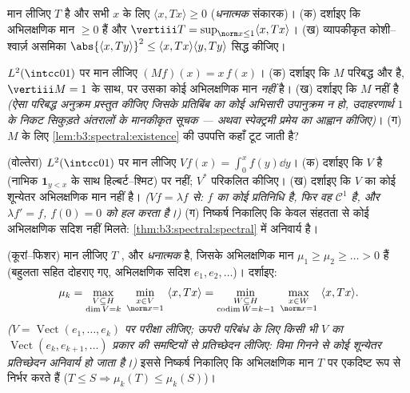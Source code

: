 \begin{exercise}[$\star\star$]\label{exo:b3:spectral:5}
मान लीजिए $T$  है और सभी $x$ के लिए $\langle x, Tx\rangle \geq 0$
(\emph{धनात्मक} संकारक)।
(क) दर्शाइए कि अभिलक्षणिक मान $\geq 0$ हैं और $\vertiii T =
\sup_{\norm x\leq1}\langle x, Tx\rangle$।
(ख) व्यापकीकृत कोशी--श्वार्ज़ असमिका $\abs{\langle x, Ty\rangle}^2 \leq \langle x, Tx\rangle\langle
y, Ty\rangle$ सिद्ध कीजिए।
\end{exercise}

\begin{exercise}[$\star\star$]\label{exo:b3:spectral:6}
$L^2(\intcc01)$ पर मान लीजिए $(Mf)(x) = x\,f(x)$।
(क) दर्शाइए कि $M$ परिबद्ध और  है, $\vertiii M =
1$ के साथ, पर
उसका कोई अभिलक्षणिक मान \emph{नहीं} है।
(ख) दर्शाइए कि $M$  नहीं है \emph{(ऐसा परिबद्ध अनुक्रम
प्रस्तुत कीजिए जिसके प्रतिबिंब का कोई अभिसारी उपानुक्रम न हो,
उदाहरणार्थ $1$ के निकट सिकुड़ते अंतरालों के मानकीकृत सूचक ---
अथवा स्पेक्ट्रमी प्रमेय का आह्वान कीजिए)}।
(ग) $M$ के लिए \cref{lem:b3:spectral:existence} की उपपत्ति कहाँ टूट जाती है?
\end{exercise}

\begin{exercise}[$\star\star$]\label{exo:b3:spectral:7}
(वोल्तेरा) $L^2(\intcc01)$ पर मान लीजिए $Vf(x) = \int_0^xf(y)\dd
y$।
(क) दर्शाइए कि $V$  है (नाभिक $\mathbf
1_{y < x}$ के साथ हिल्बर्ट--श्मिट)
पर  नहीं; $V^*$ परिकलित कीजिए।
(ख) दर्शाइए कि $V$ का कोई शून्येतर अभिलक्षणिक मान नहीं है।
\emph{($Vf =
\lambda f$ से: $f$ का कोई  प्रतिनिधि है, फिर वह $\mathcal C^1$ है,
और $\lambda f' = f$, $f(0) = 0$ को हल करता है।)}
(ग) निष्कर्ष निकालिए कि केवल संहतता से कोई अभिलक्षणिक सदिश नहीं
मिलते: \cref{thm:b3:spectral:spectral} में  अनिवार्य है।
\end{exercise}

\begin{exercise}[$\star\star\star$]\label{exo:b3:spectral:8}
(कूरां--फिशर) मान लीजिए $T$ ,  और \emph{धनात्मक}
है, जिसके अभिलक्षणिक मान $\mu_1 \geq \mu_2 \geq \dots
> 0$ हैं (बहुलता सहित दोहराए गए,
अभिलक्षणिक सदिश $e_1, e_2,
\dots$)। दर्शाइए:
\[
\mu_{k} = \max_{\substack{V \subseteq H \\ \dim V = k}}\
\min_{\substack{x \in V\\ \norm x = 1}}\ \langle x, Tx\rangle
= \min_{\substack{W \subseteq H\\ \operatorname{codim}W =
k-1}}\ \max_{\substack{x\in W\\ \norm x = 1}}\ \langle x,
Tx\rangle .
\]
\emph{($V = \operatorname{Vect}(e_1,\dots,e_k)$ पर परीक्षा लीजिए; ऊपरी परिबंध के लिए किसी भी $V$
का $\operatorname{Vect}(e_k, e_{k+1}, \dots)$ प्रकार की समष्टियों से प्रतिच्छेदन लीजिए: विमा गिनने से
कोई शून्येतर प्रतिच्छेदन अनिवार्य हो जाता है।)} इससे निष्कर्ष
निकालिए कि अभिलक्षणिक मान $T$ पर एकदिष्ट रूप से निर्भर करते हैं
($T \leq S
\Rightarrow \mu_k(T) \leq \mu_k(S)$)।
\end{exercise}

